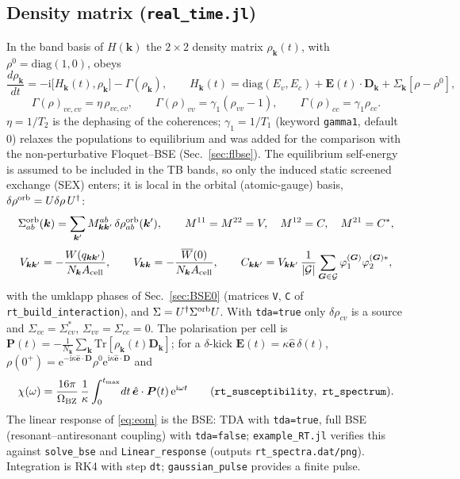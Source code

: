 \documentclass[11pt,a4paper]{article}
\newcommand{\ii}{\mathrm{i}}
\newcommand{\ee}{\mathrm{e}}
\newcommand{\kk}{\bm{k}}
\newcommand{\GG}{\bm{G}}
\newcommand{\hate}{\hat{\bm{e}}}
\newcommand{\code}[1]{\texttt{#1}}
\newcommand{\Acell}{A_{\rm cell}}
\newcommand{\Nk}{N_{\bm k}}
\newcommand{\Wbar}{\overline{W}(0)}
\begin{document}
\subsection{Density matrix (\code{real\_time.jl})}
In the band basis of $H(\kk)$ the $2\times2$ density matrix $\rho_{\kk}(t)$, with $\rho^0=\mathrm{diag}(1,0)$, obeys
\begin{equation}
\frac{d\rho_{\kk}}{dt}=-\ii\big[H_{\kk}(t),\rho_{\kk}\big]-\Gamma(\rho_{\kk}),\qquad
H_{\kk}(t)=\mathrm{diag}(E_v,E_c)+\bm E(t)\cdot\bm D_{\kk}+\Sigma_{\kk}[\rho-\rho^0],
\label{eq:eom}
\end{equation}
\begin{equation}
\Gamma(\rho)_{vc,cv}=\eta\,\rho_{vc,cv},\qquad \Gamma(\rho)_{vv}=\gamma_1(\rho_{vv}-1),\qquad \Gamma(\rho)_{cc}=\gamma_1\rho_{cc}.
\label{eq:Gamma_rel}
\end{equation}
$\eta=1/T_2$ is the dephasing of the coherences; $\gamma_1=1/T_1$ (keyword \code{gamma1}, default $0$) relaxes the populations to equilibrium
and was added for the comparison with the non-perturbative Floquet--BSE (Sec.~\ref{sec:flbse}). The equilibrium self-energy is assumed
to be included in the TB bands, so only the induced static screened exchange (SEX) enters; it is local in the orbital (atomic-gauge) basis,
$\delta\rho^{\rm orb}=U\delta\rho\,U^\dagger$:
\begin{equation}
\Sigma^{\rm orb}_{ab}(\kk)=\sum_{\kk'}M^{ab}_{\kk\kk'}\,\delta\rho^{\rm orb}_{ab}(\kk'),\qquad
M^{11}=M^{22}=V,\quad M^{12}=C,\quad M^{21}=C^*,
\label{eq:SEX}
\end{equation}
\begin{equation}
V_{\kk\kk'}=-\frac{W(q_{\kk\kk'})}{\Nk\Acell},\qquad V_{\kk\kk}=-\frac{\Wbar}{\Nk\Acell},\qquad
C_{\kk\kk'}=V_{\kk\kk'}\,\frac{1}{|\mathcal G|}\sum_{\GG\in\mathcal G}\varphi^{(\GG)}_1\varphi^{(\GG)*}_2,
\end{equation}
with the umklapp phases of Sec.~\ref{sec:BSE0} (matrices \code{V}, \code{C} of \code{rt\_build\_interaction}), and $\Sigma=U^\dagger\Sigma^{\rm orb}U$.
With \code{tda=true} only $\delta\rho_{cv}$ is a source and $\Sigma_{vc}=\Sigma_{cv}^*$, $\Sigma_{vv}=\Sigma_{cc}=0$.
The polarisation per cell is $\bm P(t)=-\frac{1}{\Nk}\sum_{\kk}\mathrm{Tr}[\rho_{\kk}(t)\bm D_{\kk}]$; for a $\delta$-kick
$\bm E(t)=\kappa\hate\,\delta(t)$, $\rho(0^+)=\ee^{-\ii\kappa\hate\cdot\bm D}\rho^0\ee^{\ii\kappa\hate\cdot\bm D}$ and
\begin{equation}
\chi(\omega)=\frac{16\pi}{\Omega_{\rm BZ}}\,\frac{1}{\kappa}\int_0^{t_{\max}}\!dt\,\hate\cdot\bm P(t)\,\ee^{\ii\omega t}
\qquad(\code{rt\_susceptibility},\ \code{rt\_spectrum}).
\end{equation}
The linear response of \eqref{eq:eom} is the BSE: TDA with \code{tda=true}, full BSE (resonant--antiresonant coupling) with \code{tda=false};
\code{example\_RT.jl} verifies this against \code{solve\_bse} and \code{Linear\_response} (outputs \code{rt\_spectra.dat/png}). Integration is RK4 with step
\code{dt}; \code{gaussian\_pulse} provides a finite pulse.
\end{document}
